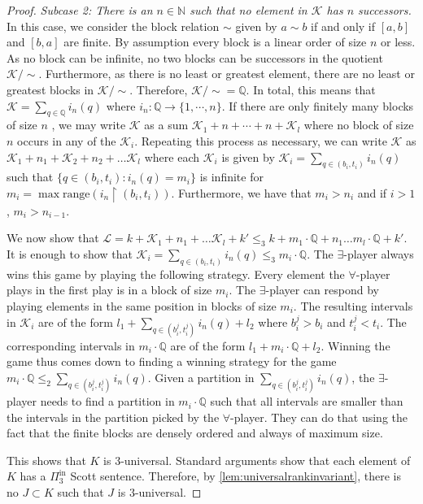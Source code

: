 \documentclass[10pt,a4paper]{amsart}
\providecommand{\L}{\mathcal{L}}
\providecommand{\Pinf}[1]{\Pi^{\mathrm{in}}_{#1}}
\newcommand{\Q}{\mathbb{Q}}
\newcommand{\K}{\mathcal{K}}
\renewcommand{\L}{\mathcal{L}}
\DeclareMathOperator{\restrict}{\upharpoonright}
\begin{document}
\begin{proof}
\emph{Subcase 2: There is an $n\in\mathbb N$ such that no element in $\K$ has
$n$ successors.} In this case, we consider the block relation $\sim$ given by
$a\sim b$ if and only if $[a,b]$ and $[b,a]$ are finite. By assumption every
block is a linear order of size $n$ or less. As no block can be infinite, no two
blocks can be successors in the quotient $\K/{\sim}$. Furthermore, as there is
no least or greatest element, there are no least or greatest blocks in
$\K/{\sim}$. Therefore, $\K/{\sim}=\Q$. In total, this means that
$\K=\sum_{q\in\Q} i_n(q)$ where $i_n:\Q\to\{1,\cdots, n\}$. If there are only
finitely many blocks of size $n$ , we may write $\K$ as a sum
$\K_1+n+\cdots+n+\K_l$ where no block of size $n$ occurs in any of the $\K_i$.
Repeating this process as necessary, we can write $\K$ as $\K_1+n_1+\K_2+n_2+\dots
\K_l$ where each $\K_i$ is given by $\K_i=\sum_{q\in(b_i,t_i)} i_n(q)$ such
that $\{ q\in (b_i,t_i): i_n(q)=m_i\}$ is infinite for $m_i=\max{\text{range}(i_n\restrict (b_i,t_i))}$.
Furthermore, we have that $m_i>n_i$ and if $i>1$, $m_i>n_{i-1}$.

We now show that $\L=k+\K_1+n_1+\dots
\K_l+k'\leq_3 k+m_1\cdot \Q+n_1\dots m_l\cdot \Q+k'$.
It is enough to show that $\K_i=\sum_{q\in(b_i,t_i)}i_n(q) \leq_3 m_i\cdot\Q$.
The $\exists$-player always wins this game by playing the following strategy.
Every element the $\forall$-player plays in the first play is in a block of size
$m_i$. The $\exists$-player can respond by playing elements in the same position
in blocks of size $m_i$. The resulting intervals in $\K_i$ are of the form
$l_1+\sum_{q\in (b_i^j,t_i^j)}i_n(q)+l_2$ where $b_i^j> b_i$ and $t_i^j<t_i$.
The corresponding intervals in $m_i\cdot \Q$ are of the form $l_1+m_i\cdot
\Q+l_2$. Winning the game thus comes down to finding a winning strategy for the
game $m_i\cdot \Q\leq_2 \sum_{q\in (b_i^j,t_i^j)}i_n(q)$. Given a partition in
$\sum_{q\in (b_i^j,t_i^j)}i_n(q)$, the $\exists$-player needs to find a
partition in $m_i\cdot \Q$ such that all intervals are smaller than the intervals
in the partition picked by the $\forall$-player. They can do
that using the fact that the finite blocks are densely ordered and always of maximum size.

This shows that $K$ is $3$-universal. Standard arguments show that each
element of $K$ has a $\Pinf3$ Scott sentence. Therefore, by \cref{lem:universalrankinvariant},
there is no $J\subset K$ such that $J$ is $3$-universal.
\end{proof}
\end{document}
